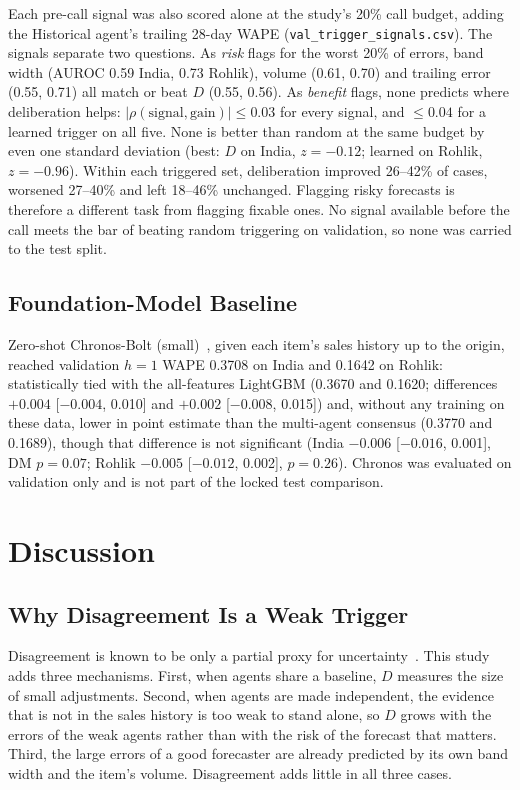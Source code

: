 \documentclass[conference]{IEEEtran}
\begin{document}
Each pre-call signal was also scored alone at the study's 20\% call budget, adding the Historical
agent's trailing 28-day WAPE (\texttt{val\_trigger\_signals.csv}). The signals separate two questions.
As \emph{risk} flags for the worst 20\% of errors, band width (AUROC 0.59 India, 0.73 Rohlik),
volume (0.61, 0.70) and trailing error (0.55, 0.71) all match or beat $D$ (0.55, 0.56). As \emph{benefit}
flags, none predicts where deliberation helps: $|\rho(\text{signal},\text{gain})|\le0.03$ for every
signal, and $\le0.04$ for a learned trigger on all five. None is better than random at the same
budget by even one standard deviation (best: $D$ on India, $z=-0.12$; learned on Rohlik, $z=-0.96$).
Within each triggered set, deliberation improved 26--42\% of cases, worsened 27--40\% and left
18--46\% unchanged. Flagging risky forecasts is therefore a different task from flagging fixable
ones. No signal available before the call meets the bar of beating random triggering on validation,
so none was carried to the test split.

\subsection{Foundation-Model Baseline}
Zero-shot Chronos-Bolt (small)~\cite{ansari2024}, given each item's sales history up to the origin,
reached validation $h=1$ WAPE 0.3708 on India and 0.1642 on Rohlik: statistically tied with the
all-features LightGBM (0.3670 and 0.1620; differences $+0.004$ [$-0.004$, 0.010] and $+0.002$
[$-0.008$, 0.015]) and, without any training on these data, lower in point estimate than the
multi-agent consensus (0.3770 and 0.1689), though that difference is not significant (India
$-0.006$ [$-0.016$, 0.001], DM $p=0.07$; Rohlik $-0.005$ [$-0.012$, 0.002], $p=0.26$). Chronos was
evaluated on validation only and is not part of the locked test comparison.

\section{Discussion}\label{sec:discussion}

\subsection{Why Disagreement Is a Weak Trigger}
Disagreement is known to be only a partial proxy for uncertainty~\cite{zarnowitz1987,whitaker1998}.
This study adds three mechanisms. First, when agents share a baseline, $D$ measures the size of small
adjustments. Second, when agents are made independent, the evidence that is not in the sales history
is too weak to stand alone, so $D$ grows with the errors of the weak agents rather than with the risk
of the forecast that matters. Third, the large errors of a good forecaster are already predicted by
its own band width and the item's volume. Disagreement adds little in all three cases.
\end{document}
